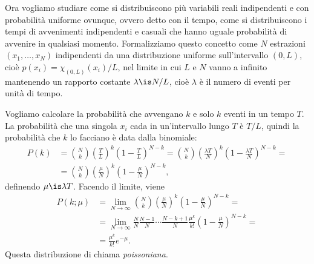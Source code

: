 
Ora vogliamo studiare come si distribuiscono più variabili reali indipendenti
e con probabilità uniforme ovunque, ovvero detto con il tempo, come si
distribuiscono i tempi di avvenimenti indipendenti e casuali che hanno uguale
probabilità di avvenire in qualsiasi momento. Formalizziamo questo concetto
come $N$ estrazioni $(x_1,\ldots,x_N)$ indipendenti da una distribuzione
uniforme sull'intervallo $(0,L)$, cioè $p(x_i) = \chi_{(0,L)}(x_i)/L$, nel
limite in cui $L$ e $N$ vanno a infinito mantenendo un rapporto costante
$\lambda \is N/L$, cioè $\lambda$ è il numero di eventi per unità di tempo.

Vogliamo calcolare la probabilità che avvengano $k$ e solo $k$ eventi in un
tempo $T$. La probabilità che una singola $x_i$ cada in un'intervallo lungo
$T$ è $T/L$, quindi la probabilità che $k$ lo facciano è data dalla binomiale:
%
\begin{align*}
    P(k) &= \binom Nk \left(\frac TL\right)^k \left(1-\frac TL\right)^{N-k}
    = \binom Nk \left(\frac{\lambda T}N\right)^k \left(1-\frac{\lambda T}N\right)^{N-k} = \\
    &= \binom Nk \left(\frac\mu N\right)^k \left(1-\frac\mu N\right)^{N-k},
\end{align*}
%
definendo $\mu \is \lambda T$. Facendo il limite, viene
%
\begin{align*}
    P(k;\mu) &= \lim_{N\to\infty}
    \binom Nk \left(\frac\mu N\right)^k \left(1-\frac\mu N\right)^{N-k} = \\
    &= \lim_{N\to\infty}
    \frac NN \frac{N-1}N \cdots \frac{N-k+1}N
    \frac{\mu^k}{k!}
    \left(1-\frac\mu N\right)^{N-k} = \\
    &= \frac{\mu^k}{k!} e^{-\mu}.
\end{align*}
%
Questa distribuzione di chiama \emph{poissoniana}.

